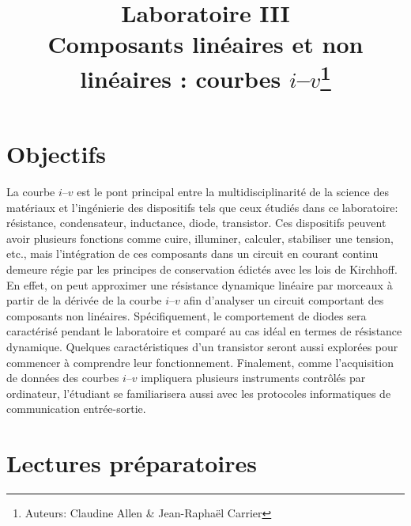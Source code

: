 \documentclass[canadien,12pt,oneside,letterpaper]{article}
\title{\textbf{Laboratoire III}\\Composants linéaires et non linéaires : courbes $i$--$v$\thanks{Auteurs: Claudine Allen \& Jean-Raphaël Carrier}}
\date{}
\begin{document}
\maketitle \vspace{-1cm}

\section{Objectifs}

La courbe $i$--$v$ est le pont principal entre la multidisciplinarité de la science des matériaux et l’ingénierie des dispositifs tels que ceux étudiés dans ce laboratoire: résistance, condensateur, inductance, diode, transistor. Ces dispositifs peuvent avoir plusieurs fonctions comme cuire, illuminer, calculer, stabiliser une tension, etc., mais l’intégration de ces composants dans un circuit en courant continu demeure régie par les principes de conservation édictés avec les lois de Kirchhoff. En effet, on peut approximer une résistance dynamique linéaire par morceaux à partir de la dérivée de la courbe $i$--$v$ afin d’analyser un circuit comportant des composants non linéaires. Spécifiquement, le comportement de diodes sera caractérisé pendant le laboratoire et comparé au cas idéal en termes de résistance dynamique. Quelques caractéristiques d’un transistor seront aussi explorées pour commencer à comprendre leur fonctionnement. Finalement, comme l’acquisition de données des courbes $i$--$v$ impliquera plusieurs instruments contrôlés par ordinateur, l’étudiant se familiarisera aussi avec les protocoles informatiques de communication entrée-sortie.

\section[Lectures préparatoires]{Lectures préparatoires} \label{sec:prep}
\end{document}

